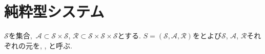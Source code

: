 
\section{純粋型システム}
\begin{definition}
$\mathcal{S}$を集合,\ $\mathcal{A} \subset \mathcal{S} \times \mathcal{S}$, $\mathcal{R} \subset \mathcal{S} \times \mathcal{S} \times \mathcal{S}$とする.
$S = (\mathcal{S}, \mathcal{A}, \mathcal{R})$をとよび$\mathcal{S}$, $\mathcal{A}$, $\mathcal{R}$それぞれの元を, , と呼ぶ.
\end{definition}
